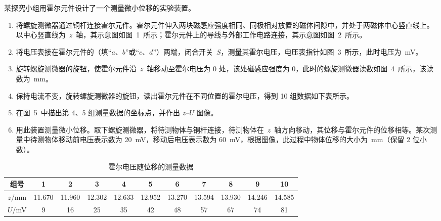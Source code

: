 \begin{question}
某探究小组用霍尔元件设计了一个测量微小位移的实验装置。


\begin{enumerate}[leftmargin=2em, label=(\arabic*)]
  \item 将螺旋测微器通过铜杆连接霍尔元件。霍尔元件伸入两块磁感应强度相同、同极相对放置的磁体间隙中，并处于两磁体中心竖直线上。以中心竖直线为~$z$~轴，其示意图如图~1~所示；霍尔元件上的导线与外部工作电路连接，其示意图如图~2~所示。
  \item 将电压表接在霍尔元件的\gkblank（填``$a$、$b$''或``$c$、$d$''）两端，闭合开关~$S$，测量其霍尔电压，电压表指针如图~3~所示，此时电压为\gkblank~mV。
  \item 旋转螺旋测微器的旋钮，使霍尔元件沿~$z$~轴移动至霍尔电压为 0 处，该处磁感应强度为 0，此时的螺旋测微器读数如图~4~所示，该读数为\gkblank~mm。
  \item 保持电流不变，旋转螺旋测微器的旋钮，读出霍尔元件在不同位置的霍尔电压，得到 10 组数据如下表所示。
  \item 在图~5~中描出第 4、5 组测量数据的坐标点，并作出 $z$--$U$ 图像。\gkblank
  \item 用此装置测量微小位移。取下螺旋测微器，将待测物体与铜杆连接，待测物体在~$z$~轴方向移动，其位移与霍尔元件的位移相等。某次测量中待测物体移动前电压表示数为 \SI{20}{\milli\volt}，移动后电压表示数为 \SI{60}{\milli\volt}，根据图像，此过程中物体位移的大小为\gkblank~mm（保留 2 位小数）。
\end{enumerate}

\begin{table}[ht]
\centering
\caption{霍尔电压随位移的测量数据}
\small
\begin{tabular}{ccccccccccc}
\toprule
组号 & 1 & 2 & 3 & 4 & 5 & 6 & 7 & 8 & 9 & 10\\
\midrule
$z$/mm & 11.670 & 11.960 & 12.302 & 12.633 & 12.952 & 13.270 & 13.594 & 13.930 & 14.246 & 14.585\\
$U$/mV & 9 & 16 & 25 & 35 & 42 & 48 & 57 & 67 & 74 & 81\\
\bottomrule
\end{tabular}
\end{table}


\end{question}

